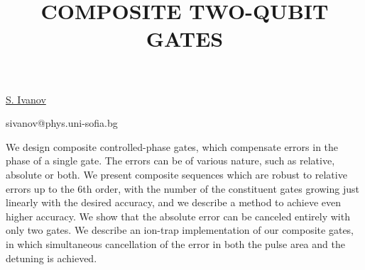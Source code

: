 \title{COMPOSITE TWO-QUBIT GATES}

\underline{S. Ivanov}

{\normalsize{
\vspace{-4mm} \unisofia


\email sivanov@phys.uni-sofia.bg}}

We design composite controlled-phase gates, which compensate errors in the phase of a single gate.
The errors can be of various nature, such as relative, absolute or both.
We present composite sequences which are robust to relative errors up to the 6th order, with the number of the constituent gates growing just linearly with the desired accuracy,
 and we describe a method to achieve even higher accuracy.
We show that the absolute error can be canceled entirely with only two gates.
We describe an ion-trap implementation of our composite gates, in which simultaneous cancellation of the error in both the pulse area and the detuning is achieved.

\vspace{\baselineskip}
